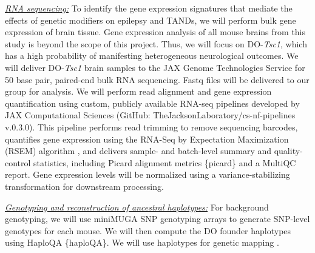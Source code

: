 \documentclass[
  12pt,
]{article}
\begin{document}
\textit{\underline{RNA sequencing:}} To identify the gene expression
signatures that mediate the effects of genetic modifiers on epilepsy and
TANDs, we will perform bulk gene expression of brain tissue. Gene
expression analysis of all mouse brains from this study is beyond the
scope of this project. Thus, we will focus on DO-\textit{Tsc1}, which
has a high probability of manifesting heterogeneous neurological
outcomes. We will deliver DO-\textit{Tsc1} brain samples to the JAX
Genome Technologies Service for 50 base pair, paired-end bulk RNA
sequencing. Fastq files will be delivered to our group for analysis. We
will perform read alignment and gene expression quantification using
custom, publicly available RNA-seq pipelines developed by JAX
Computational Sciences (GitHub: TheJacksonLaboratory/cs-nf-pipelines
v.0.3.0). This pipeline performs read trimming to remove sequencing
barcodes, quantifies gene expression using the RNA-Seq by Expectation
Maximization (RSEM) algorithm \cite{21816040}, and delivers sample- and
batch-level summary and quality-control statistics, including Picard
alignment metrics \{picard\} and a MultiQC \cite{27312411} report. Gene
expression levels will be normalized using a variance-stabilizing
transformation \cite{25516281, 23497356} for downstream processing.

\textit{\underline{Genotyping and reconstruction of ancestral haplotypes:}}
For background genotyping, we will use miniMUGA SNP genotyping arrays
\cite{33067325} to generate SNP-level genotypes for each mouse. We will
then compute the DO founder haplotypes using HaploQA \{haploQA\}. We
will use haplotypes for genetic mapping \cite{25237114}.
\end{document}
